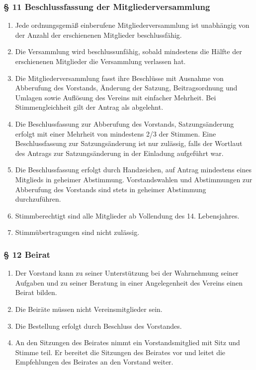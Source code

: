 \documentclass[a4paper,10pt]{article}
\begin{document}
\newpage

\subsubsection*{§ 11 Beschlussfassung der Mitgliederversammlung}
\begin{enumerate}
  \item Jede ordnungsgemäß einberufene Mitgliederversammlung ist unabhängig von der
Anzahl der erschienenen Mitglieder beschlussfähig.
\item Die Versammlung wird beschlussunfähig, sobald mindestens die Hälfte der
erschienenen Mitglieder die Versammlung verlassen hat.
\item Die Mitgliederversammlung fasst ihre Beschlüsse mit Ausnahme von
  Abberufung des Vorstands, Änderung der Satzung, Beitragsordnung und
  Umlagen sowie Auflösung des Vereins mit einfacher Mehrheit.  Bei
  Stimmengleichheit gilt der Antrag als abgelehnt.
\item Die Beschlussfassung zur Abberufung des Vorstands, Satzungsänderung erfolgt mit
einer Mehrheit von mindestens 2/3 der Stimmen. Eine Beschlussfassung zur
Satzungsänderung ist nur zulässig, falls der Wortlaut des Antrags zur
Satzungsänderung in der Einladung aufgeführt war.
\item Die Beschlussfassung erfolgt durch Handzeichen, auf Antrag mindestens eines
Mitglieds in geheimer Abstimmung. Vorstandswahlen und Abstimmungen zur
Abberufung des Vorstands sind stets in geheimer Abstimmung durchzuführen.
\item Stimmberechtigt sind alle Mitglieder ab Vollendung des 14. Lebensjahres.
\item Stimmübertragungen sind nicht zulässig.
\end{enumerate}


\subsubsection*{§ 12 Beirat}
\begin{enumerate}
  \item Der Vorstand kann zu seiner Unterstützung bei der Wahrnehmung seiner Aufgaben
und zu seiner Beratung in einer Angelegenheit des Vereins einen Beirat bilden.
\item Die Beiräte müssen nicht Vereinsmitglieder sein.
\item Die Bestellung erfolgt durch Beschluss des Vorstandes.
\item An den Sitzungen des Beirates nimmt ein Vorstandsmitglied mit Sitz und Stimme
teil. Er bereitet die Sitzungen des Beirates vor und leitet die Empfehlungen des
Beirates an den Vorstand weiter.
\end{enumerate}
\end{document}
